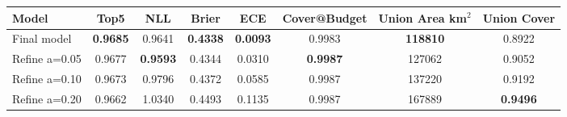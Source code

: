 \begin{tabular}{lccccccc}
\toprule
Model & Top5 & NLL & Brier & ECE & Cover@Budget & Union Area km$^2$ & Union Cover \\
\midrule
Final model & \textbf{0.9685} & 0.9641 & \textbf{0.4338} & \textbf{0.0093} & 0.9983 & \textbf{118810} & 0.8922 \\
Refine a=0.05 & 0.9677 & \textbf{0.9593} & 0.4344 & 0.0310 & \textbf{0.9987} & 127062 & 0.9052 \\
Refine a=0.10 & 0.9673 & 0.9796 & 0.4372 & 0.0585 & 0.9987 & 137220 & 0.9192 \\
Refine a=0.20 & 0.9662 & 1.0340 & 0.4493 & 0.1135 & 0.9987 & 167889 & \textbf{0.9496} \\
\bottomrule
\end{tabular}
